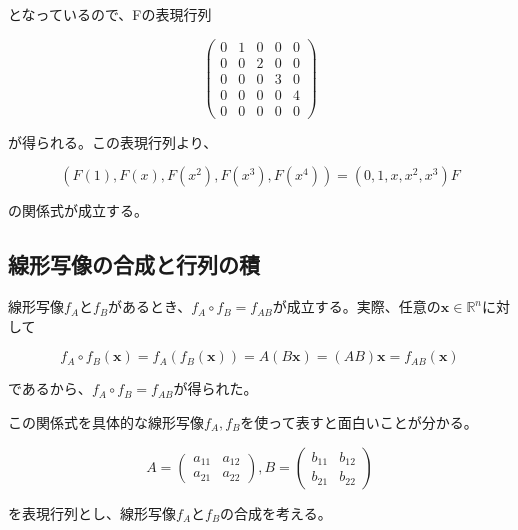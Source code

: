 \documentclass[dvipdfmx,autodetect-engine]{jsarticle}
\newcommand{\vecSpace}[1]{\mathbb{R}^{#1}}
\begin{document}
となっているので、Fの表現行列

$$
\begin{pmatrix}
0 & 1 & 0 & 0 & 0 \\
0 & 0 & 2 & 0 & 0 \\
0 & 0 & 0 & 3 & 0 \\
0 & 0 & 0 & 0 & 4 \\
0 & 0 & 0 & 0 & 0
\end{pmatrix}
$$

が得られる。この表現行列より、

$$
(F(1), F(x), F(x^2), F(x^3), F(x^4)) = (0, 1, x, x^2, x^3)F
$$

の関係式が成立する。


\subsection{線形写像の合成と行列の積}

線形写像$f_A$と$f_B$があるとき、$f_A \circ f_B = f_{AB}$が成立する。実際、任意の$\bm{x} \in \vecSpace{n}$に対して

$$
f_A \circ f_B(\bm{x}) = f_A(f_B(\bm{x})) = A(B\bm{x}) = (AB)\bm{x} = f_{AB}(\bm{x})
$$

であるから、$f_A \circ f_B = f_{AB}$が得られた。

この関係式を具体的な線形写像$f_A, f_B$を使って表すと面白いことが分かる。

$$
A = \begin{pmatrix}
a_{11} & a_{12} \\
a_{21} & a_{22}
\end{pmatrix}, 
B = \begin{pmatrix}
b_{11} & b_{12} \\
b_{21} & b_{22}
\end{pmatrix}
$$

を表現行列とし、線形写像$f_A$と$f_B$の合成を考える。
\end{document}
